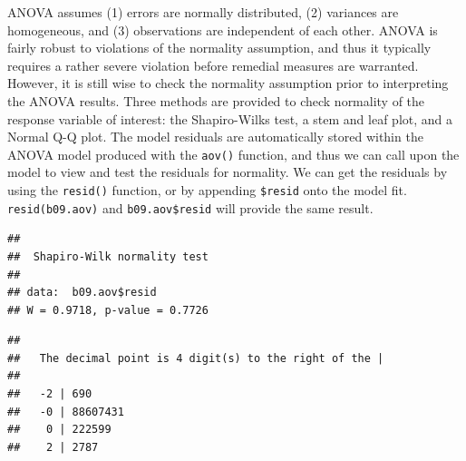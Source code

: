 \documentclass[letterpaper,]{book}
\newenvironment{Shaded}{\begin{snugshade}}{\end{snugshade}}
\newcommand{\DataTypeTok}[1]{\textcolor[rgb]{0.13,0.29,0.53}{#1}}
\newcommand{\DecValTok}[1]{\textcolor[rgb]{0.00,0.00,0.81}{#1}}
\newcommand{\FloatTok}[1]{\textcolor[rgb]{0.00,0.00,0.81}{#1}}
\newcommand{\KeywordTok}[1]{\textcolor[rgb]{0.13,0.29,0.53}{\textbf{#1}}}
\newcommand{\NormalTok}[1]{#1}
\newcommand{\OperatorTok}[1]{\textcolor[rgb]{0.81,0.36,0.00}{\textbf{#1}}}
\begin{document}
ANOVA assumes (1) errors are normally distributed, (2) variances are homogeneous, and (3) observations are independent of each other. ANOVA is fairly robust to violations of the normality assumption, and thus it typically requires a rather severe violation before remedial measures are warranted. However, it is still wise to check the normality assumption prior to interpreting the ANOVA results. Three methods are provided to check normality of the response variable of interest: the Shapiro-Wilks test, a stem and leaf plot, and a Normal Q-Q plot. The model residuals are automatically stored within the ANOVA model produced with the \texttt{aov()} function, and thus we can call upon the model to view and test the residuals for normality. We can get the residuals by using the \texttt{resid()} function, or by appending \texttt{\$resid} onto the model fit. \texttt{resid(b09.aov)} and \texttt{b09.aov\$resid} will provide the same result.

\begin{Shaded}
\end{Shaded}

\begin{verbatim}
## 
##  Shapiro-Wilk normality test
## 
## data:  b09.aov$resid
## W = 0.9718, p-value = 0.7726
\end{verbatim}

\begin{Shaded}
\end{Shaded}

\begin{verbatim}
## 
##   The decimal point is 4 digit(s) to the right of the |
## 
##   -2 | 690
##   -0 | 88607431
##    0 | 222599
##    2 | 2787
\end{verbatim}



\begin{Shaded}
\end{Shaded}
\end{document}
